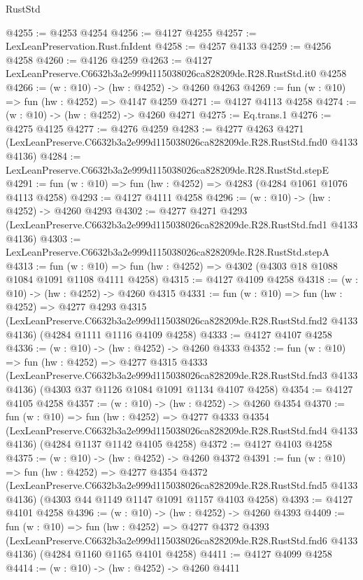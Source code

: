 \begin{lexlean}{RustStd}
\begin{coremodule}
@4255 := @4253 @4254
@4256 := @4127 @4255
@4257 := LexLeanPreservation.Rust.fnIdent
@4258 := @4257 @4133
@4259 := @4256 @4258
@4260 := @4126 @4259
@4263 := @4127 LexLeanPreserve.C6632b3a2e999d115038026ca828209de.R28.RustStd.it0 @4258
@4266 := (w : @10) -> (hw : @4252) -> @4260 @4263
@4269 := fun (w : @10) => fun (hw : @4252) => @4147 @4259
@4271 := @4127 @4113 @4258
@4274 := (w : @10) -> (hw : @4252) -> @4260 @4271
@4275 := Eq.trans.{1}
@4276 := @4275 @4125
@4277 := @4276 @4259
@4283 := @4277
    @4263
    @4271
    (LexLeanPreserve.C6632b3a2e999d115038026ca828209de.R28.RustStd.fnd0 @4133 @4136)
@4284 := LexLeanPreserve.C6632b3a2e999d115038026ca828209de.R28.RustStd.stepE
@4291 := fun (w : @10) => fun (hw : @4252) => @4283 (@4284 @1061 @1076 @4113 @4258)
@4293 := @4127 @4111 @4258
@4296 := (w : @10) -> (hw : @4252) -> @4260 @4293
@4302 := @4277
    @4271
    @4293
    (LexLeanPreserve.C6632b3a2e999d115038026ca828209de.R28.RustStd.fnd1 @4133 @4136)
@4303 := LexLeanPreserve.C6632b3a2e999d115038026ca828209de.R28.RustStd.stepA
@4313 := fun (w : @10) => fun (hw : @4252) => @4302 (@4303 @18 @1088 @1084 @1091 @1108 @4111 @4258)
@4315 := @4127 @4109 @4258
@4318 := (w : @10) -> (hw : @4252) -> @4260 @4315
@4331 := fun (w : @10) =>
  fun (hw : @4252) =>
  @4277
    @4293
    @4315
    (LexLeanPreserve.C6632b3a2e999d115038026ca828209de.R28.RustStd.fnd2 @4133 @4136)
    (@4284 @1111 @1116 @4109 @4258)
@4333 := @4127 @4107 @4258
@4336 := (w : @10) -> (hw : @4252) -> @4260 @4333
@4352 := fun (w : @10) =>
  fun (hw : @4252) =>
  @4277
    @4315
    @4333
    (LexLeanPreserve.C6632b3a2e999d115038026ca828209de.R28.RustStd.fnd3 @4133 @4136)
    (@4303 @37 @1126 @1084 @1091 @1134 @4107 @4258)
@4354 := @4127 @4105 @4258
@4357 := (w : @10) -> (hw : @4252) -> @4260 @4354
@4370 := fun (w : @10) =>
  fun (hw : @4252) =>
  @4277
    @4333
    @4354
    (LexLeanPreserve.C6632b3a2e999d115038026ca828209de.R28.RustStd.fnd4 @4133 @4136)
    (@4284 @1137 @1142 @4105 @4258)
@4372 := @4127 @4103 @4258
@4375 := (w : @10) -> (hw : @4252) -> @4260 @4372
@4391 := fun (w : @10) =>
  fun (hw : @4252) =>
  @4277
    @4354
    @4372
    (LexLeanPreserve.C6632b3a2e999d115038026ca828209de.R28.RustStd.fnd5 @4133 @4136)
    (@4303 @44 @1149 @1147 @1091 @1157 @4103 @4258)
@4393 := @4127 @4101 @4258
@4396 := (w : @10) -> (hw : @4252) -> @4260 @4393
@4409 := fun (w : @10) =>
  fun (hw : @4252) =>
  @4277
    @4372
    @4393
    (LexLeanPreserve.C6632b3a2e999d115038026ca828209de.R28.RustStd.fnd6 @4133 @4136)
    (@4284 @1160 @1165 @4101 @4258)
@4411 := @4127 @4099 @4258
@4414 := (w : @10) -> (hw : @4252) -> @4260 @4411

\end{coremodule}
\end{lexlean}
